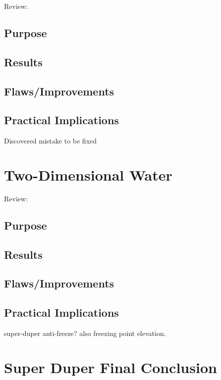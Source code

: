 Review:
\subsection{Purpose}
\subsection{Results}
\subsection{Flaws/Improvements}
\subsection{Practical Implications} 
Discovered mistake to be fixed

\section{Two-Dimensional Water}

Review:
\subsection{Purpose}
\subsection{Results}
\subsection{Flaws/Improvements}
\subsection{Practical Implications} 
super-duper anti-freeze? also freezing point elevation.

\section{Super Duper Final Conclusion}

